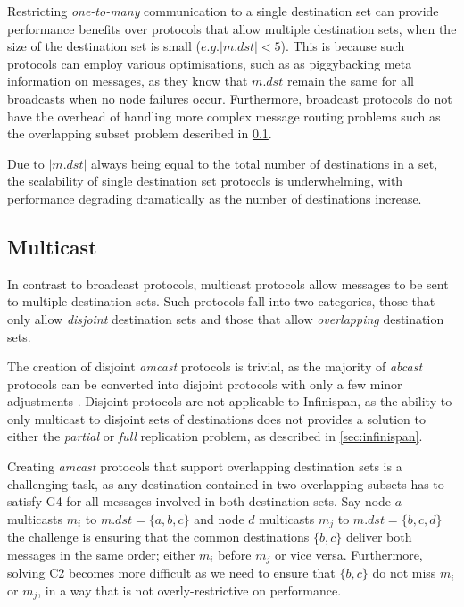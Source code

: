 	Restricting \emph{one-to-many} communication to a single destination set can provide performance benefits over protocols that allow multiple destination sets, when the size of the destination set is small ($e.g. \left\vert{m.dst}\right\vert < 5$).   This is because such protocols can employ various optimisations, such as as piggybacking meta information on messages, as they know that $m.dst$ remain the same for all broadcasts when no node failures occur.  Furthermore, broadcast protocols do not have the overhead of handling more complex message routing problems such as the overlapping subset problem described in \ref{ssec:atomic_multicast}.  
	
	Due to $\left\vert{m.dst}\right\vert$ always being equal to the total number of destinations in a set, the scalability of single destination set protocols is underwhelming, with performance degrading dramatically as the number of destinations increase.  
	
	\subsection{Multicast}\label{ssec:atomic_multicast}
	In contrast to broadcast protocols, multicast protocols allow messages to be sent to multiple destination sets.  Such protocols fall into two categories, those that only allow \emph{disjoint} destination sets and those that allow \emph{overlapping} destination sets.  
	
	The creation of disjoint \emph{amcast} protocols is trivial, as the majority of \emph{abcast} protocols can be converted into disjoint protocols with only a few minor adjustments \cite{Defago:2004:TOB:1041680.1041682}.  Disjoint protocols are not applicable to Infinispan, as the ability to only multicast to disjoint sets of destinations does not provides a solution to either the \emph{partial} or \emph{full} replication problem, as described in \ref{sec:infinispan}.  
        
        Creating \emph{amcast} protocols that support overlapping destination sets is a challenging task, as any destination contained in two overlapping subsets has to satisfy G4 for all messages involved in both destination sets.  Say node $a$ multicasts $m_i$ to $m.dst = \{a,b,c\}$ and node $d$ multicasts $m_j$ to $m.dst = \{b,c,d\}$ the challenge is ensuring that the common destinations $\{b,c\}$ deliver both messages in the same order; either $m_i$ before $m_j$ or vice versa.  Furthermore, solving C2 becomes more difficult as we need to ensure that $\{b,c\}$ do not miss $m_i$ or $m_j$, in a way that is not overly-restrictive on performance.  
        
